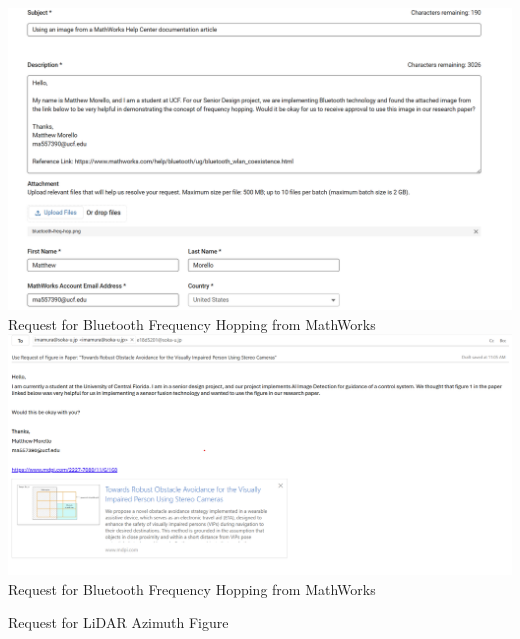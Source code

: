 \begin{center}
\includegraphics[width=\textwidth]{./Images/BT_Image_Use_MW.png}
\newline Request for Bluetooth Frequency Hopping from MathWorks\\

\includegraphics[width=\textwidth]{./Images/Grid_Image_Perm.png}
\newline Request for Bluetooth Frequency Hopping from MathWorks\\

\vspace{3\baselineskip} %

\newline Request for LiDAR Azimuth Figure\\


\end{center}
